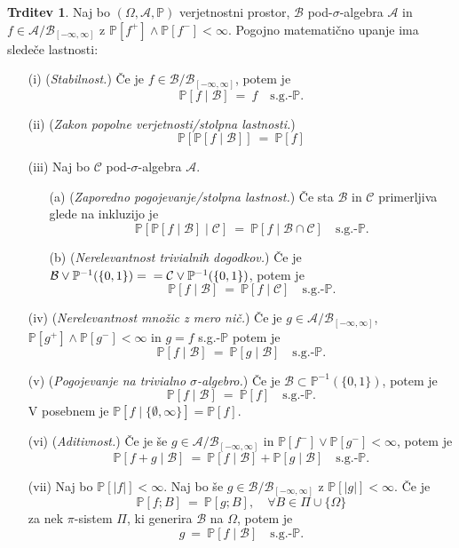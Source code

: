 \documentclass[11pt]{article}
\renewcommand{\P}{\mathbb{P}}
\newcommand{\A}{\mathcal{A}}
\newcommand{\BB}{\mathcal{B}}
\newcommand{\CC}{\mathcal{C}}
\newcommand{\B}{\mathscr{B}}
\newcommand{\set}[1]{\{#1\}}
\newcommand{\1}{\mathbbm{1}}
\newcommand{\rr}{[-\infty,\infty]}
\theoremstyle{definition}
\theoremstyle{definition}
\newtheorem{trditev}{Trditev}[section]
\theoremstyle{definition}
\theoremstyle{definition}
\begin{document}
\begin{trditev}

Naj bo $(\Omega, \A, \P)$ verjetnostni prostor, $\BB$ pod-$\sigma$-algebra $\A$ in $f \in \A/\B_{\rr}$ z $\P[f^+]\wedge\P[f^-]<\infty$. Pogojno matematično upanje ima sledeče lastnosti:
\begin{enumerate}

\item[(i)] (\textit{Stabilnost.}) Če je $f \in \BB/\B_{\rr}$, potem je
$$\P[f \mid \BB] ~=~ f \quad \text{s.g.-}\P.$$

\item[(ii)] (\textit{Zakon popolne verjetnosti/stolpna lastnosti.})
$$\P[\P[f \mid \BB]] ~=~ \P[f]$$

\item[(iii)] Naj bo $\CC$ pod-$\sigma$-algebra $\A$.
\begin{itemize}
	\item[(a)] (\textit{Zaporedno pogojevanje/stolpna lastnost.}) Če sta $\BB$ in $\CC$ primerljiva glede na inkluzijo je
	$$\P[\P[f \mid \BB] \mid \CC] ~=~ \P[f \mid \BB \cap \CC] \quad \text{s.g.-}\P.$$
	\item[(b)] (\textit{Nerelevantnost trivialnih dogodkov.}) Če je $\BB\vee\P^{-1}(\set{0,1}) = \\=\CC\vee\P^{-1}(\set{0,1})$, potem je
	$$\P[f \mid \BB] ~=~ \P[f \mid \CC] \quad \text{s.g.-}\P.$$
\end{itemize}

\item[(iv)] (\textit{Nerelevantnost množic z mero nič.}) Če je $g \in \A/\B_{\rr}$, $\P[g^+]\wedge\P[g^-]<\infty$ in $g=f$ s.g.-$\P$ potem je 
$$\P[f \mid \BB] ~=~ \P[g \mid \BB] \quad \text{s.g.-}\P.$$

\item[(v)] (\textit{Pogojevanje na trivialno $\sigma$-algebro.}) Če je $\BB \subset \P^{-1}(\set{0,1})$, potem je
$$\P[f \mid \BB] ~=~ \P[f] \quad \text{s.g.-}\P.$$
V posebnem je $\P[f \mid \set{\emptyset,\infty}] = \P[f]$.

\item[(vi)] (\textit{Aditivnost.}) Če je še $g \in \A/\B_{\rr}$ in $\P[f^-]\vee\P[g^-]<\infty$, potem je
$$\P[f+g \mid \BB] ~=~ \P[f \mid \BB] + \P[g \mid \BB] \quad \text{s.g.-}\P.$$

\item[(vii)] Naj bo $\P[|f|]<\infty$. Naj bo še $g \in \BB/\B_{\rr}$ z $\P[|g|]<\infty$. Če je
$$\P[f;B] ~=~ \P[g;B], \quad \forall B \in \Pi \cup \set{\Omega}$$
za nek $\pi$-sistem $\Pi$, ki generira $\BB$ na $\Omega$, potem je
$$g ~=~ \P[f \mid \BB] \quad \text{s.g.-}\P.$$


\end{enumerate}
\end{trditev}
\end{document}
